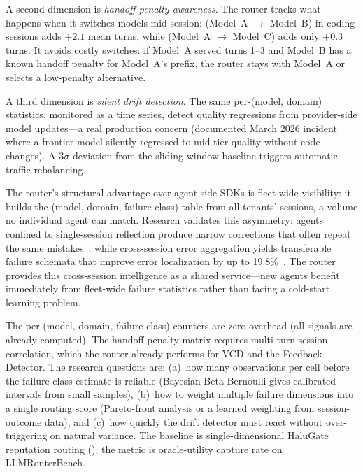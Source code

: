 \begin{opportunity}
A second dimension is \emph{handoff penalty awareness}.  The router
tracks what happens when it switches models mid-session: (Model~A
$\to$ Model~B) in coding sessions adds $+2.1$ mean turns, while
(Model~A $\to$ Model~C) adds only $+0.3$ turns.  It avoids costly
switches: if Model~A served turns 1--3 and Model~B has a known
handoff penalty for Model~A's prefix, the router stays with Model~A
or selects a low-penalty alternative.

A third dimension is \emph{silent drift detection}.  The same
per-(model, domain) statistics, monitored as a time series, detect
quality regressions from provider-side model updates---a real
production concern (documented March 2026 incident where a frontier
model silently regressed to mid-tier quality without code changes).
A 3$\sigma$ deviation from the sliding-window baseline triggers
automatic traffic rebalancing.

The router's structural advantage over agent-side SDKs is fleet-wide
visibility: it builds the (model, domain, failure-class) table from
all tenants' sessions, a volume no individual agent can match.
Research validates this asymmetry: agents confined to single-session
reflection produce narrow corrections that often repeat the same
mistakes~\cite{samule2025}, while cross-session error aggregation
yields transferable failure schemata that improve error localization
by up to 19.8\%~\cite{correct2025}.  The router provides this
cross-session intelligence as a shared service---new agents benefit
immediately from fleet-wide failure statistics rather than facing a
cold-start learning problem.

\begin{frisk}
The per-(model, domain, failure-class) counters are zero-overhead
(all signals are already computed).  The handoff-penalty matrix
requires multi-turn session correlation, which the router already
performs for VCD and the Feedback Detector.  The research questions
are: (a)~how many observations per cell before the failure-class
estimate is reliable (Bayesian Beta-Bernoulli gives calibrated
intervals from small samples), (b)~how to weight multiple failure
dimensions into a single routing score (Pareto-front analysis or
a learned weighting from session-outcome data), and (c)~how
quickly the drift detector must react without over-triggering on
natural variance.  The baseline is single-dimensional HaluGate
reputation routing (); the metric
is oracle-utility capture rate on LLMRouterBench.
\end{frisk}
\end{opportunity}

